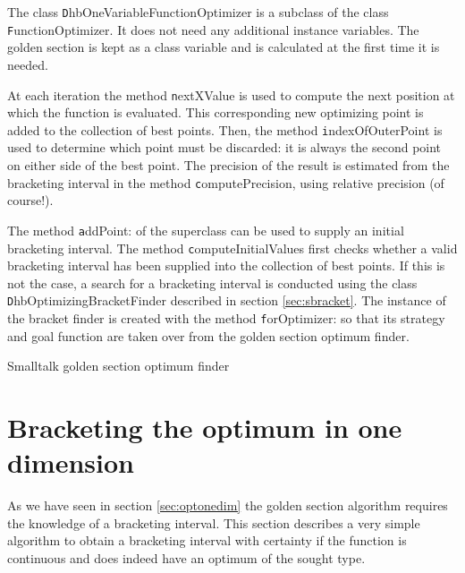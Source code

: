 The class {\texttt DhbOneVariableFunctionOptimizer} is a subclass of
the class {\texttt FunctionOptimizer}. It does not need any additional
instance variables. The golden section is kept as a class variable
and is calculated at the first time it is needed.

At each iteration the method {\texttt nextXValue} is used to compute
the next position at which the function is evaluated. This
corresponding new optimizing point is added to the collection of
best points. Then, the method {\texttt indexOfOuterPoint} is used to
determine which point must be discarded: it is always the second
point on either side of the best point. The precision of the
result is estimated from the bracketing interval in the method
{\texttt computePrecision}, using relative precision (of course!).

The method {\texttt addPoint:} of the superclass can be used to supply
an initial bracketing interval. The method {\texttt
computeInitialValues} first checks whether a valid bracketing
interval has been supplied into the collection of best points. If
this is not the case, a search for a bracketing interval is
conducted using the class {\texttt DhbOptimizingBracketFinder}
described in section \ref{sec:sbracket}. The instance of the
bracket finder is created with the method {\texttt forOptimizer:} so
that its strategy and goal function are taken over from the golden
section optimum finder.

\begin{listing} Smalltalk golden section optimum finder \label{ls:optimizerOneDim}

\end{listing}

\section{Bracketing the optimum in one dimension}
\label{sec:bracket} As we have seen in section \ref{sec:optonedim}
the golden section algorithm requires the knowledge of a
bracketing interval. This section describes a very simple
algorithm to obtain a bracketing interval with certainty if the
function is continuous and does indeed have an optimum of the
sought type.

